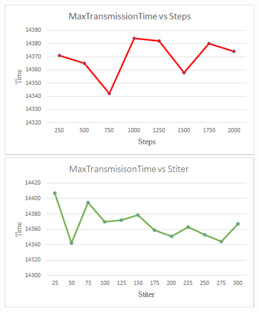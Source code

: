 \documentclass[a4paper,10pt]{report}
\begin{document}
		\begin{figure}[H]
          \includegraphics[width=\linewidth]{images/Time vs Steps.png}
        \endminipage\hfill
          \includegraphics[width=\linewidth]{images/Time vs Stiter.png}
        \endminipage
        \end{figure}
        
\end{document}
